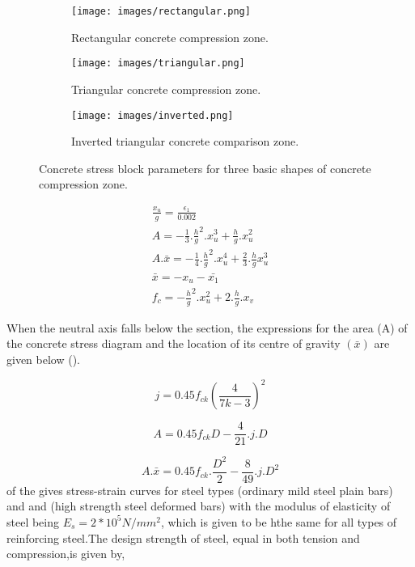 \begin{figure}
\centering
\begin{subfigure}{0.5\textwidth}
\texttt{[image: images/rectangular.png]}
\caption{Rectangular concrete compression zone.}
\label{fig:rectangular}
\end{subfigure}
%
\begin{subfigure}{0.5\textwidth}
\centering
\texttt{[image: images/triangular.png]}
\caption{Triangular concrete compression zone.}
\label{fig:triangular}
\end{subfigure}
%
\begin{subfigure}{0.5\textwidth}
\centering
\texttt{[image: images/inverted.png]}
\caption{Inverted triangular concrete comparison zone.}
\label{fig:inverted}
\end{subfigure}
\caption{Concrete stress block parameters for three basic shapes of concrete compression zone.}
\label{fig:concrete}
\end{figure}

\begin{align}
\frac{x_u}{g}=\frac{\epsilon_1}{0.002}\\
A=-\frac{1}{3}.\frac{h}{g}^2.x_u^3+\frac{h}{g}.x_u^2\\
A.\bar{x}=-\frac{1}{4}.\frac{h}{g}^2.x_u^4+\frac{2}{3}.\frac{h}{g}x_u^3\\
\bar{x}=-x_u-\bar{x_1}\\
f_c=-\frac{h}{g}^2.x_u^2+2.\frac{h}{g}.x_v
\end{align}

When the neutral axis falls below the section, the expressions for the
area (A) of the concrete stress diagram and the location of its centre
of gravity $(\bar x)$ are given below ().

\begin{equation}
j=0.45f_{ck}\left(\frac{4}{7k-3}\right)^2
\end{equation}

\begin{equation}
A=0.45f_{ck}D-\frac{4}{21}.j.D
\end{equation}

\begin{equation}
A.\bar{x}=0.45f_{ck}.\frac{D^2}{2}-\frac{8}{49}.j.D^2
\end{equation}
 of the  gives stress-strain curves for
steel types  (ordinary mild steel plain bars) and {\fefouronefive} and
{\fefivezerozero} (high strength steel deformed bars) with the modulus
of elasticity of steel being $E_s = 2*10^5 N/mm^2$, which is given to be
hthe same for all types of reinforcing steel.The design strength of
steel, equal in both tension and compression,is given by,

